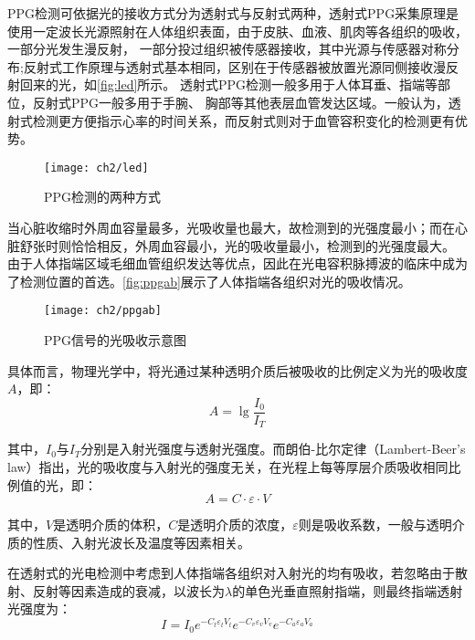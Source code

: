 PPG检测可依据光的接收方式分为透射式与反射式两种\cite{THOCBPM}，透射式PPG采集原理是使用一定波长光源照射在人体组织表面，由于皮肤、血液、肌肉等各组织的吸收，一部分光发生漫反射，
一部分投过组织被传感器接收，其中光源与传感器对称分布;反射式工作原理与透射式基本相同，区别在于传感器被放置光源同侧接收漫反射回来的光\cite{THOCBPM,mmt}，如\autoref{fig:led}所示。
透射式PPG检测一般多用于人体耳垂、指端等部位，反射式PPG一般多用于手腕、
胸部等其他表层血管发达区域\cite{THOCBPM}。一般认为，透射式检测更方便指示心率的时间关系，而反射式则对于血管容积变化的检测更有优势\cite{mmt}。
\begin{figure}[htb]
    \centering
    \texttt{[image: ch2/led]}
    \caption{\label{fig:led}PPG检测的两种方式}
\end{figure}

当心脏收缩时外周血容量最多，光吸收量也最大，故检测到的光强度最小；而在心脏舒张时则恰恰相反，外周血容最小，光的吸收量最小，检测到的光强度最大\cite{lhc,cwl}。
由于人体指端区域毛细血管组织发达等优点，因此在光电容积脉搏波的临床中成为了检测位置的首选。\autoref{fig:ppgab}展示了人体指端各组织对光的吸收情况。
\begin{figure}[htb]
    \centering
    \texttt{[image: ch2/ppgab]}
    \caption{\label{fig:ppgab}PPG信号的光吸收示意图}
\end{figure}

具体而言，物理光学中，将光通过某种透明介质后被吸收的比例定义为光的吸收度$A$，即：
\begin{equation}
    \label{equ:LBL}
    A=\lg\frac{I_{0}}{I_{T}}
\end{equation}

其中，$I_{0}$与$I_{T}$分别是入射光强度与透射光强度。而朗伯-比尔定律（Lambert-Beer's law）指出，光的吸收度与入射光的强度无关，在光程上每等厚层介质吸收相同比例值的光，即：
\begin{equation}
    \label{equ:LBL2}
    A=C \cdot \varepsilon \cdot V
\end{equation}

其中，$V$是透明介质的体积，$C$是透明介质的浓度，$\varepsilon$则是吸收系数，一般与透明介质的性质、入射光波长及温度等因素相关。

在透射式的光电检测中考虑到人体指端各组织对入射光的均有吸收，若忽略由于散射、反射等因素造成的衰减，以波长为$\lambda$的单色光垂直照射指端，则最终指端透射光强度为\cite{4122392}：
\begin{equation}
    \label{equ:AF1}
    I=I_{0}e^{-C_{t}\varepsilon _{t}V_{t}}e^{-C_{v}\varepsilon _{v}V_{v}} e^{-C_{a}\varepsilon _{a}V_{a}} 
\end{equation}

